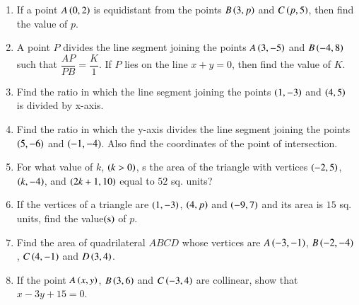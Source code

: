 \documentclass[journal,12pt,onecolumn]{IEEEtran}
\theoremstyle{remark}
\begin{document}
\begin{enumerate}
\item If a point $A\left(0,2\right)$ is equidistant from the points $B\left(3,p\right)$ and $C\left(p,5\right)$, then find the value of $p$. 
\item A point $P$ divides the line segment joining the points $A\left(3,-5\right)$ and $B\left(-4,8\right)$ such that $\dfrac{AP}{PB} = \dfrac{K}{1}$. If $P$ lies on the line $x + y = 0$, then find the value of $K$. 
\item Find the ratio in which the line segment joining the points $\left(1,-3\right)$ and $\left(4,5\right)$ is divided by x-axis. 
\item Find the ratio in which the y-axis divides the line segment joining the points $\left(5,-6\right)$ and $\left(-1,-4\right)$. Also find the coordinates of the point of intersection. 

\item For what value of $k$, $\left( k > 0\right)$, s the area of the triangle with vertices $\left(-2,5\right)$, $\left(k,-4\right)$, and $\left(2k+1,10\right)$ equal to $52$ sq. units? 

\item If the vertices of a triangle are $\left(1,-3\right)$, $\left(4,p\right)$ and $\left(-9,7\right)$ and its area is $15$ sq. units, find the value$\left(\text{s}\right)$ of $p$. 
\item Find the area of quadrilateral $ABCD$ whose vertices are $A\left(-3,-1\right)$, $B\left(-2,-4\right)$, $C\left(4,-1\right)$ and $D\left(3,4\right)$.

\item If the point $A\left(x,y\right)$, $B\left(3,6\right)$ and $C\left(-3,4\right)$ are collinear, show that $x - 3y + 15 = 0$. 
\end{enumerate}
\end{document}
